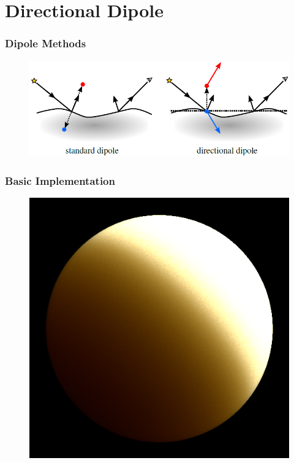 \section{Directional Dipole}

\begin{frame}
  \frametitle{Dipole Methods}
  \begin{figure}[!ht]
    \centering
    \includegraphics[scale=0.55]{dipoles.png}
  \end{figure}
\end{frame}

\begin{frame}
  \frametitle{Basic Implementation}
  \begin{figure}[!ht]
    \centering
    \includegraphics[scale=0.4]{render.png}
  \end{figure}

\end{frame}
